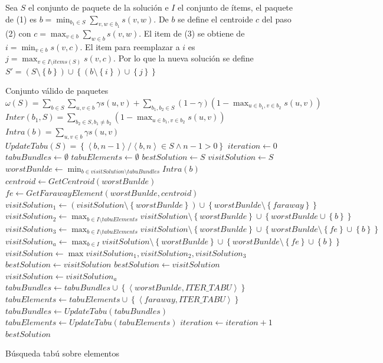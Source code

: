 Sea $S$ el conjunto de paquete de la solución e $I$ el conjunto de ítems, el paquete de (1) es $b = \min_{b_1 \in S}{\sum_{v,w \in b_1}{s(v,w)}}$. De $b$ se define el centroide $c$ del paso (2) con $c = \max_{v \in b}{\sum_{w \in b}{s(v,w)}}$. El item de (3) se obtiene de $i = \min_{v \in b}{s(v,c)}$. El item para reemplazar a $i$ es $j = \max_{v \in I \setminus items(S)}{s(v,c)}$. Por lo que la nueva solución se define $S' = (S \setminus \left\{b\right\}) \cup \left\{(b \setminus \left\{i\right\})\cup\left\{j\right\}\right\}$

\begin{algorithm}[H]
\begin{algorithmic}[1]
\ENSURE Conjunto válido de paquetes
\STATE $\omega(S) = \sum_{b \in S}{\sum_{u,v \in b}{\gamma s(u,v)}} + \sum_{b_1,b_2 \in S}{(1-\gamma) (1-\max_{u \in b_1, v \in b_2}{s(u,v)})}$
\STATE $Inter(b_1, S) = \sum_{b_2 \in S, b_1\neq b_2}{(1-\max_{u \in b_1, v \in b_2}{s(u,v)})}$
\STATE $Intra(b) = \sum_{u,v \in b}{\gamma s(u,v)}$
\STATE $UpdateTabu(S) = \left\{ \left\langle b, n-1 \right\rangle  / \left\langle b, n \right\rangle \in S \wedge n-1 > 0 \right\}$
\STATE $iteration \leftarrow 0$
\STATE $tabuBundles \leftarrow \emptyset$
\STATE $tabuElements \leftarrow \emptyset$
\STATE $bestSolution \leftarrow S$
\STATE $visitSolution \leftarrow S$
  \STATE $worstBunlde \leftarrow \min_{b \in visitSolution \setminus tabuBundles}{Intra(b)}$
  \STATE $centroid \leftarrow GetCentroid(worstBunlde)$
  \STATE $fe \leftarrow GetFarawayElement(worstBunlde,centroid)$
	\STATE $visitSolution_1 \leftarrow (visitSolution \setminus \left\{worstBunlde\right\}) \cup \left\{worstBunlde \setminus \left\{faraway\right\}\right\}$
	\STATE $visitSolution_2 \leftarrow \max_{b \in I \setminus tabuElements}{visitSolution \setminus \left\{worstBunlde\right\} \cup \left\{worstBunlde\cup\left\{b\right\}\right\}}$
	\STATE $visitSolution_3 \leftarrow \max_{b \in I \setminus tabuElements}{visitSolution \setminus \left\{worstBunlde\right\} \cup \left\{worstBunlde \setminus \left\{fe\right\}\cup\left\{b\right\}\right\}}$
	\STATE $visitSolution_a \leftarrow \max_{b \in I}{visitSolution \setminus \left\{worstBunlde\right\} \cup \left\{worstBunlde \setminus \left\{fe\right\}\cup\left\{b\right\}\right\}}$
	\STATE $visitSolution \leftarrow \max{visitSolution_1,visitSolution_2,visitSolution_3}$
		\STATE $bestSolution \leftarrow visitSolution$
  \ENDIF
		\STATE $bestSolution \leftarrow visitSolution$
		\STATE $visitSolution \leftarrow visitSolution_a$
  \ENDIF
	\STATE $tabuBundles \leftarrow tabuBundles \cup \left\{
	\left\langle worstBunlde, ITER\_TABU \right\rangle\right\}$
  \STATE $tabuElements \leftarrow tabuElements \cup \left\{
	\left\langle faraway, ITER\_TABU \right\rangle\right\}$
	\STATE $tabuBundles \leftarrow UpdateTabu(tabuBundles)$
  \STATE $tabuElements \leftarrow UpdateTabu(tabuElements)$
	\STATE $iteration \leftarrow iteration + 1$
\ENDWHILE
\RETURN $bestSolution$
\end{algorithmic}
\caption{Búsqueda tabú sobre elementos}\label{alg:algBusTabuIntra}
\end{algorithm}
